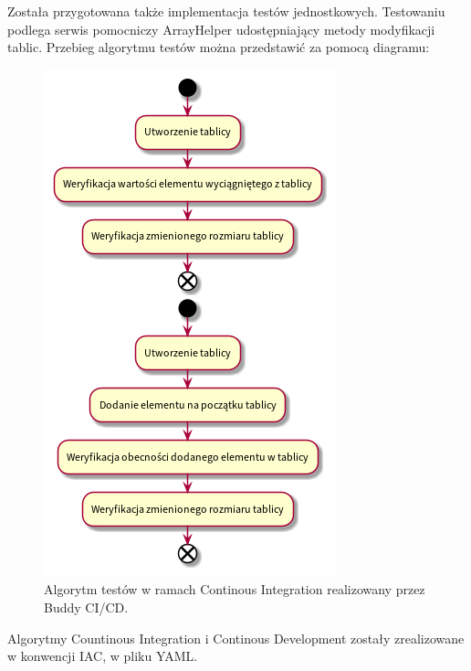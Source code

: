Została przygotowana także implementacja testów jednostkowych.
Testowaniu podlega serwis pomocniczy ArrayHelper udostępniający metody modyfikacji tablic.
Przebieg algorytmu testów można przedstawić za pomocą diagramu:

\begin{figure}[H]
	\begin{center}
		\includegraphics[scale=0.6]{media/ContinousIntegration.png}
	\end{center}
	\caption{Algorytm testów w ramach Continous Integration realizowany przez Buddy CI/CD.}
	\label{rys:continous-integration}
\end{figure}

Algorytmy Countinous Integration i Continous Development zostały zrealizowane w konwencji IAC, w pliku YAML.